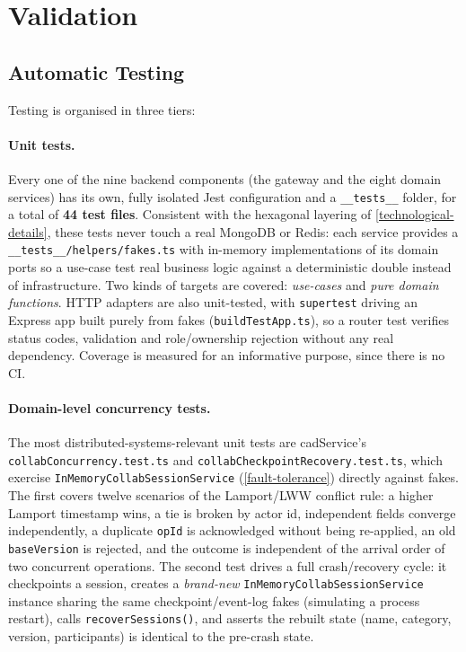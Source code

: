 \section{Validation}\label{validation}

\subsection{Automatic Testing}\label{automatic-testing}

Testing is organised in three tiers:

\begin{sloppypar}
\paragraph{Unit tests.} Every one of the nine backend components (the gateway
and the eight domain services) has its own, fully isolated Jest
configuration and a \texttt{\_\_tests\_\_} folder, for a total of \textbf{44
test files}. Consistent with the hexagonal layering of
\cref{technological-details}, these tests never touch a real MongoDB or
Redis: each service provides a \texttt{\_\_tests\_\_/helpers/fakes.ts} with
in-memory implementations of its domain ports so a use-case test real business logic
against a deterministic double instead of infrastructure. Two kinds of
targets are covered: \emph{use-cases} and \emph{pure domain functions}.
HTTP adapters are also unit-tested, with \texttt{supertest} driving an
Express app built purely from fakes (\texttt{buildTestApp.ts}), so a router
test verifies status codes, validation and role/ownership rejection without
any real dependency. Coverage is measured for an informative purpose, since there is no CI.
\end{sloppypar}

\paragraph{Domain-level concurrency tests.} The most distributed-systems-relevant
unit tests are cadService's \texttt{collabConcurrency.test.ts} and
\texttt{collabCheckpointRecovery.test.ts}, which exercise
\texttt{InMemoryCollabSessionService} (\cref{fault-tolerance}) directly
against fakes. The first covers twelve scenarios of the Lamport/LWW conflict
rule: a higher Lamport timestamp wins, a tie is broken by actor id,
independent fields converge independently, a duplicate \texttt{opId} is
acknowledged without being re-applied, an old \texttt{baseVersion} is
rejected, and the outcome is independent of the arrival order of two
concurrent operations.
The second test drives a full crash/recovery cycle: it checkpoints a
session, creates a \emph{brand-new} \texttt{InMemoryCollabSessionService}
instance sharing the same checkpoint/event-log fakes (simulating a process
restart), calls \texttt{recoverSessions()}, and asserts the rebuilt state
(name, category, version, participants) is identical to the pre-crash state.

